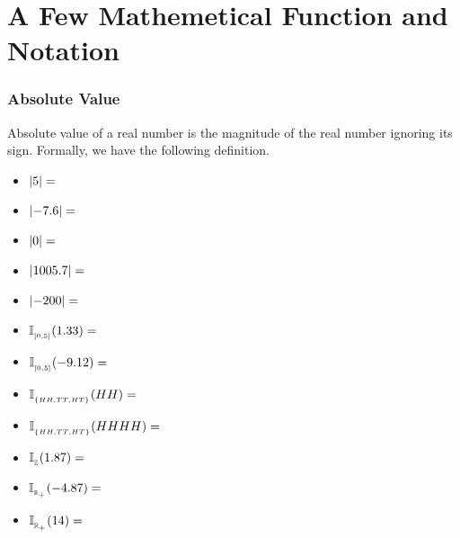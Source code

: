 \documentclass[compress]{beamer}
\begin{document}
\section{A Few Mathemetical Function and Notation}



\begin{frame}\frametitle{Absolute Value}
Absolute value of a real number is the magnitude of the real number ignoring its sign.  Formally, we have the following definition. 


\begin{itemize}
\item $\left\lvert{5}\right \rvert= $ 
\item $\left\lvert{-7.6}\right \rvert=  $
\item $\left\lvert{0}\right \rvert=  $
\item $\left\lvert{1005.7}\right \rvert=  $
\item $\left\lvert{-200}\right \rvert=  $
\end{itemize}


\end{frame}



\begin{frame}


\begin{itemize}
\item $\mathbb{I}_{_{[0,5]}}({1.33 })= $ 
\item $\mathbb{I}_{_{[0,5]}}({-9.12 })=  $
\item $\mathbb{I}_{_{\{HH,TT, HT\}}}({HH })=  $
\item $\mathbb{I}_{_{\{HH,TT, HT\}}}({HHHH })=  $
\item $\mathbb{I}_{_{\mathbb{Z}}}({1.87 })=  $
\item $\mathbb{I}_{_{\mathbb{R}_{+}}}({-4.87 })=  $
\item $\mathbb{I}_{_{\mathbb{R}_{+}}}({14 })=  $
\end{itemize}
\end{frame}
\end{document}
